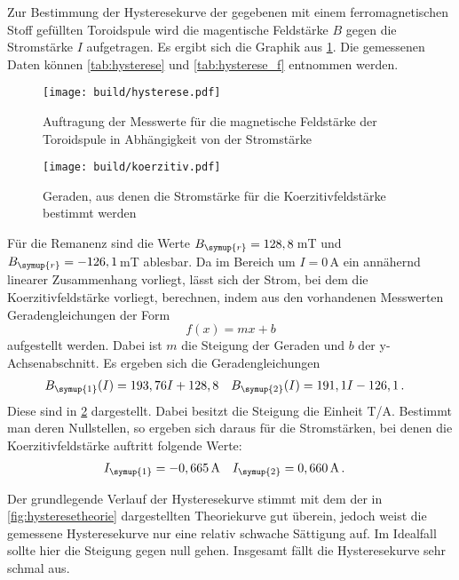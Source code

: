 Zur Bestimmung der Hysteresekurve der gegebenen mit einem ferromagnetischen Stoff
gefüllten Toroidspule wird die magentische Feldstärke $B$ gegen die Stromstärke
$I$ aufgetragen. Es ergibt sich die Graphik aus \ref{fig:hysterese}. Die gemessenen
Daten können \ref{tab:hysterese} und \ref{tab:hysterese_f}  entnommen werden.

\begin{figure}
  \centering
  \texttt{[image: build/hysterese.pdf]}
  \caption{Auftragung der Messwerte für die magnetische Feldstärke der Toroidspule
  in Abhängigkeit von der Stromstärke}
  \label{fig:hysterese}
\end{figure}

\begin{figure}
  \centering
  \texttt{[image: build/koerzitiv.pdf]}
  \caption{Geraden, aus denen die Stromstärke für die Koerzitivfeldstärke bestimmt werden}
  \label{fig:koerzitiv}
\end{figure}



Für die Remanenz sind die Werte $B_{\symup{r}}=128,8$\,mT und $B_{\symup{r}}=-126,1$\,mT
ablesbar. Da im Bereich um $I=0$\,A ein annähernd linearer Zusammenhang vorliegt, lässt
sich der Strom, bei dem die Koerzitivfeldstärke vorliegt, berechnen, indem aus den vorhandenen
Messwerten Geradengleichungen der Form
\begin{equation}
  f(x)=mx+b
  \end{equation}
aufgestellt werden. Dabei ist $m$ die Steigung der Geraden und $b$ der y-Achsenabschnitt.
Es ergeben sich die Geradengleichungen
\begin{align}
  B_{\symup{1}}(I)&=193,76I+128,8 & B_{\symup{2}}(I)&=191,1I-126,1\,.
\end{align}
Diese sind in \ref{fig:koerzitiv} dargestellt. Dabei besitzt die Steigung die Einheit
T/A.
Bestimmt man deren Nullstellen, so ergeben sich daraus für die Stromstärken, bei
denen die Koerzitivfeldstärke auftritt folgende Werte:
\begin{align}
  I_{\symup{1}}&=-0,665\,\text{A} & I_{\symup{2}}&=0,660\,\text{A}\,.
\end{align}


Der grundlegende Verlauf der Hysteresekurve stimmt mit dem der in \ref{fig:hysteresetheorie}
dargestellten Theoriekurve gut überein, jedoch weist
die gemessene Hysteresekurve nur eine relativ schwache Sättigung auf. Im Idealfall sollte
hier die Steigung gegen null gehen. Insgesamt fällt die Hysteresekurve sehr schmal aus.

